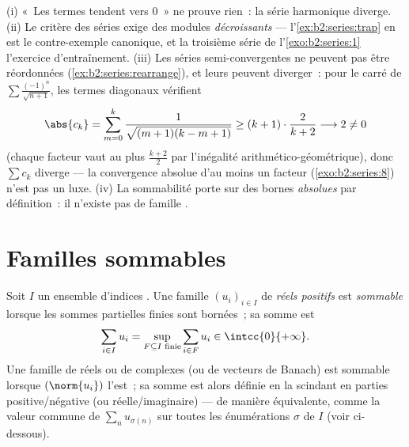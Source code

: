 \begin{remark}\label{rem:b2:series:pitfalls}
(i) «~Les termes tendent vers $0$~» ne prouve rien~: la série
harmonique diverge. (ii) Le critère des séries  exige des
modules \emph{décroissants} --- l'\cref{ex:b2:series:trap} en est le
contre-exemple canonique, et la troisième série de
l'\cref{exo:b2:series:1} l'exercice d'entraînement. (iii) Les séries
semi-convergentes ne peuvent pas être réordonnées
(\cref{ex:b2:series:rearrange}), et leurs  peuvent
diverger~: pour le carré de $\sum\frac{(-1)^n}{\sqrt{n+1}}$, les
termes diagonaux vérifient
\[
\abs{c_k} = \sum_{m=0}^{k}
\frac{1}{\sqrt{(m+1)(k-m+1)}}
\geq (k+1)\cdot\frac{2}{k+2} \longrightarrow 2 \neq 0
\]
(chaque facteur vaut au plus $\frac{k+2}2$ par l'inégalité
arithmético-géométrique), donc $\sum c_k$ diverge --- la convergence
absolue d'au moins un facteur (\cref{exo:b2:series:8}) n'est pas un
luxe. (iv) La sommabilité porte sur des bornes \emph{absolues} par
définition~: il n'existe pas de famille .
\end{remark}

\section{Familles sommables}

\begin{definition}\label{def:b2:series:summable}
Soit $I$ un ensemble d'indices . Une famille $(u_i)_{i
\in I}$ de \emph{réels positifs} est \emph{sommable} lorsque les sommes partielles finies sont bornées~; sa
somme est
\[
\sum_{i \in I} u_i = \sup_{F \subseteq I \text{ finie}} \sum_{i
\in F} u_i \in \intcc{0}{+\infty} .
\]
Une famille de réels ou de complexes (ou de vecteurs de Banach) est
sommable lorsque $(\norm{u_i})$ l'est~; sa somme est alors définie en
la scindant en parties positive/négative (ou réelle/imaginaire) ---
de manière équivalente, comme la valeur commune de $\sum_{n}
u_{\sigma(n)}$ sur toutes les énumérations $\sigma$ de $I$ (voir
ci-dessous).
\end{definition}

